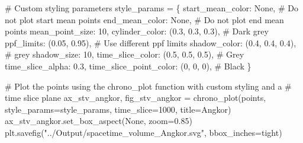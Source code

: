 \documentclass[
  11pt,
  letterpaper,
  DIV=11,
  numbers=noendperiod]{scrartcl}
\newenvironment{Shaded}{\begin{snugshade}}{\end{snugshade}}
\newcommand{\CommentTok}[1]{\textcolor[rgb]{0.37,0.37,0.37}{#1}}
\newcommand{\DecValTok}[1]{\textcolor[rgb]{0.68,0.00,0.00}{#1}}
\newcommand{\FloatTok}[1]{\textcolor[rgb]{0.68,0.00,0.00}{#1}}
\newcommand{\NormalTok}[1]{\textcolor[rgb]{0.00,0.23,0.31}{#1}}
\newcommand{\OperatorTok}[1]{\textcolor[rgb]{0.37,0.37,0.37}{#1}}
\newcommand{\StringTok}[1]{\textcolor[rgb]{0.13,0.47,0.30}{#1}}
\newcommand{\VariableTok}[1]{\textcolor[rgb]{0.07,0.07,0.07}{#1}}
\begin{document}
\begin{Shaded}
\begin{Highlighting}[]
\CommentTok{\# Custom styling parameters}
\NormalTok{style\_params }\OperatorTok{=}\NormalTok{ \{}
    \StringTok{\textquotesingle{}start\_mean\_color\textquotesingle{}}\NormalTok{: }\VariableTok{None}\NormalTok{,  }\CommentTok{\# Do not plot start mean points}
    \StringTok{\textquotesingle{}end\_mean\_color\textquotesingle{}}\NormalTok{: }\VariableTok{None}\NormalTok{, }\CommentTok{\# Do not plot end mean points}
    \StringTok{\textquotesingle{}mean\_point\_size\textquotesingle{}}\NormalTok{: }\DecValTok{10}\NormalTok{,}
    \StringTok{\textquotesingle{}cylinder\_color\textquotesingle{}}\NormalTok{: (}\FloatTok{0.3}\NormalTok{, }\FloatTok{0.3}\NormalTok{, }\FloatTok{0.3}\NormalTok{),  }\CommentTok{\# Dark grey}
    \StringTok{\textquotesingle{}ppf\_limits\textquotesingle{}}\NormalTok{: (}\FloatTok{0.05}\NormalTok{, }\FloatTok{0.95}\NormalTok{),  }\CommentTok{\# Use different ppf limits}
    \StringTok{\textquotesingle{}shadow\_color\textquotesingle{}}\NormalTok{: (}\FloatTok{0.4}\NormalTok{, }\FloatTok{0.4}\NormalTok{, }\FloatTok{0.4}\NormalTok{),  }\CommentTok{\# grey}
    \StringTok{\textquotesingle{}shadow\_size\textquotesingle{}}\NormalTok{: }\DecValTok{10}\NormalTok{,}
    \StringTok{\textquotesingle{}time\_slice\_color\textquotesingle{}}\NormalTok{: (}\FloatTok{0.5}\NormalTok{, }\FloatTok{0.5}\NormalTok{, }\FloatTok{0.5}\NormalTok{),  }\CommentTok{\# Grey}
    \StringTok{\textquotesingle{}time\_slice\_alpha\textquotesingle{}}\NormalTok{: }\FloatTok{0.3}\NormalTok{,}
    \StringTok{\textquotesingle{}time\_slice\_point\_color\textquotesingle{}}\NormalTok{: (}\DecValTok{0}\NormalTok{, }\DecValTok{0}\NormalTok{, }\DecValTok{0}\NormalTok{),  }\CommentTok{\# Black}
\NormalTok{\}}

\CommentTok{\# Plot the points using the chrono\_plot function with custom styling and a }
\CommentTok{\# time slice plane}
\NormalTok{ax\_stv\_angkor, fig\_stv\_angkor }\OperatorTok{=}\NormalTok{ chrono\_plot(points, }
\NormalTok{                                            style\_params}\OperatorTok{=}\NormalTok{style\_params, }
\NormalTok{                                            time\_slice}\OperatorTok{=}\DecValTok{1000}\NormalTok{,}
\NormalTok{                                            title}\OperatorTok{=}\StringTok{\textquotesingle{}Angkor\textquotesingle{}}\NormalTok{)}
\NormalTok{ax\_stv\_angkor.set\_box\_aspect(}\VariableTok{None}\NormalTok{, zoom}\OperatorTok{=}\FloatTok{0.85}\NormalTok{)}
\NormalTok{plt.savefig(}\StringTok{"../Output/spacetime\_volume\_Angkor.svg"}\NormalTok{, bbox\_inches}\OperatorTok{=}\StringTok{\textquotesingle{}tight\textquotesingle{}}\NormalTok{) }
\end{Highlighting}
\end{Shaded}
\end{document}
